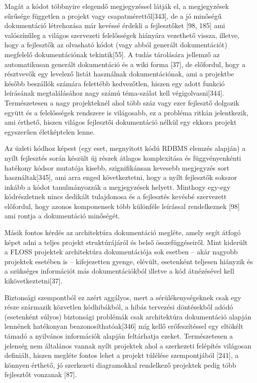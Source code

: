 \documentclass[12pt,magyar,a4paper,oneside]{scrreprt}
\begin{document}
Magát a kódot többnyire elegendő megjegyzéssel látják el, a megjegyzések
sűrűsége független a projekt vagy csapatmérettől{[}343{]}, de a jó
minőségű dokumentáció létrehozása már kevéssé érdekli a fejlesztőket
{[}98, 185{]} ami valószínűleg a világos szervezeti felelősségek
hiányára vezethető vissza, illetve, hogy a fejlesztők az olvasható kódot
(vagy abból generált dokumentációt) megfelelő dokumentációnak
tekintik{[}55{]}. A tudás tárolására jellemző az automatikusan generált
dokumentáció és a wiki forma {[}37{]}, de előfordul, hogy a résztvevők
egy levelező listát használnak dokumentációnak, ami a projektbe később
beszállók számára felettébb kedvezőtlen, hiszen egy adott funkció
leírásának megtalálásához nagy számú téma-szálat kell
végigolvasni{[}344{]}. Természetesen a nagy projekteknél ahol több száz
vagy ezer fejlesztő dolgozik együtt és a felelősségek rendszere is
világosabb, ez a probléma ritkán jelentkezik, ami érthető, hiszen
világos fejlesztői dokumentáció nélkül egy ekkora projekt egyszerűen
életképtelen lenne.

Az üzleti kódhoz képest (egy eset, megnyitott kódú RDBMS elemzés
alapján) a nyílt fejlesztés során készült új részek átlagos komplexitása
és függvényenkénti hatékony kódsor mutatója kisebb, szignifikánsan
kevesebb megjegyzés sort használtak{[}345{]}, ami arra enged
következtetni, hogy a nyílt fejlesztők sokszor inkább a kódot
tanulmányozzák a megjegyzések helyett. Minthogy egy-egy kódrészletnek
nincs dedikált tulajdonosa és a fejlesztés kevésbé szervezett előfordul,
hogy azonos komponensek több különféle leírással rendelkeznek {[}98{]}
ami rontja a dokumentáció minőségét.

Másik fontos kérdés az architektúra dokumentáció megléte, amely segít
átfogó képet adni a teljes projekt struktúrájáról és belső
összefüggéseiről. Mint kiderült a FLOSS projektek architektúra
dokumentációja sok esetben -- akár nagyobb projektek esetében is --
kifejezetten gyenge, elévült, esetenként teljesen hiányzik és a
szükséges információt más dokumentációkból illetve a kód átnézésével
kell kikövetkeztetni{[}37{]}.

Biztonsági szempontból ez azért aggályos, mert a sérülékenységeknek csak
egy része származik közvetlen kódhibákból, a hibás tervezési döntésekből
adódó (esetenként súlyos) biztonsági problémák csak architektúra
dokumentáció alapján lennének hatékonyan beazonosíthatóak{[}346{]} míg
kellő erőfeszítéssel egy eltökélt támadó a nyilvános információk alapján
feltárhatja ezeket. Természetesen a jelenség nem általános vannak nyílt
projektek ahol a szerkezeti felépítés világosan definiált, hiszen
megléte fontos lehet a projekt túlélése szempontjából {[}241{]}, a
könnyen érthető, jó szerkezeti diagramokkal rendelkező projektek pedig
több fejlesztőt vonzanak {[}87{]}.
\end{document}

